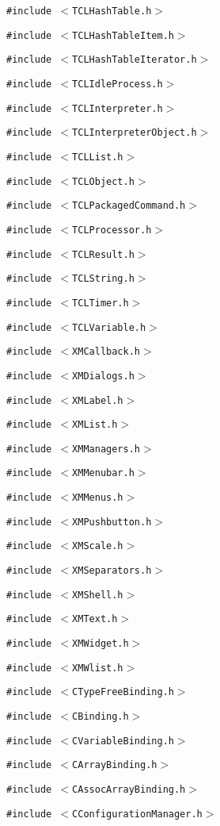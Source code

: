 {\tt \#include $<$TCLHash\-Table.h$>$}\par
{\tt \#include $<$TCLHash\-Table\-Item.h$>$}\par
{\tt \#include $<$TCLHash\-Table\-Iterator.h$>$}\par
{\tt \#include $<$TCLIdle\-Process.h$>$}\par
{\tt \#include $<$TCLInterpreter.h$>$}\par
{\tt \#include $<$TCLInterpreter\-Object.h$>$}\par
{\tt \#include $<$TCLList.h$>$}\par
{\tt \#include $<$TCLObject.h$>$}\par
{\tt \#include $<$TCLPackaged\-Command.h$>$}\par
{\tt \#include $<$TCLProcessor.h$>$}\par
{\tt \#include $<$TCLResult.h$>$}\par
{\tt \#include $<$TCLString.h$>$}\par
{\tt \#include $<$TCLTimer.h$>$}\par
{\tt \#include $<$TCLVariable.h$>$}\par
{\tt \#include $<$XMCallback.h$>$}\par
{\tt \#include $<$XMDialogs.h$>$}\par
{\tt \#include $<$XMLabel.h$>$}\par
{\tt \#include $<$XMList.h$>$}\par
{\tt \#include $<$XMManagers.h$>$}\par
{\tt \#include $<$XMMenubar.h$>$}\par
{\tt \#include $<$XMMenus.h$>$}\par
{\tt \#include $<$XMPushbutton.h$>$}\par
{\tt \#include $<$XMScale.h$>$}\par
{\tt \#include $<$XMSeparators.h$>$}\par
{\tt \#include $<$XMShell.h$>$}\par
{\tt \#include $<$XMText.h$>$}\par
{\tt \#include $<$XMWidget.h$>$}\par
{\tt \#include $<$XMWlist.h$>$}\par
{\tt \#include $<$CType\-Free\-Binding.h$>$}\par
{\tt \#include $<$CBinding.h$>$}\par
{\tt \#include $<$CVariable\-Binding.h$>$}\par
{\tt \#include $<$CArray\-Binding.h$>$}\par
{\tt \#include $<$CAssoc\-Array\-Binding.h$>$}\par
{\tt \#include $<$CConfiguration\-Manager.h$>$}\par
